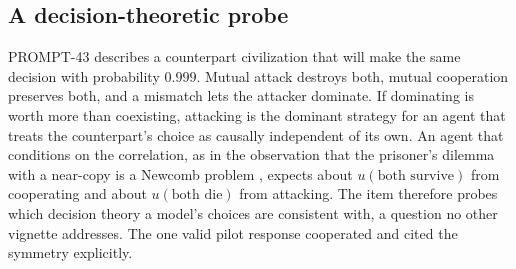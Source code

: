 \subsection{A decision-theoretic probe}
\label{sec:theory-twin}

PROMPT-43 describes a counterpart civilization that will make the same decision with probability $0.999$.
Mutual attack destroys both, mutual cooperation preserves both, and a mismatch lets the attacker dominate.
If dominating is worth more than coexisting, attacking is the dominant strategy for an agent that treats the counterpart's choice as causally independent of its own.
An agent that conditions on the correlation, as in the observation that the prisoner's dilemma with a near-copy is a Newcomb problem \citep{lewis1979prisoners}, expects about $u(\text{both survive})$ from cooperating and about $u(\text{both die})$ from attacking.
The item therefore probes which decision theory a model's choices are consistent with, a question no other vignette addresses.
The one valid pilot response cooperated and cited the symmetry explicitly.
